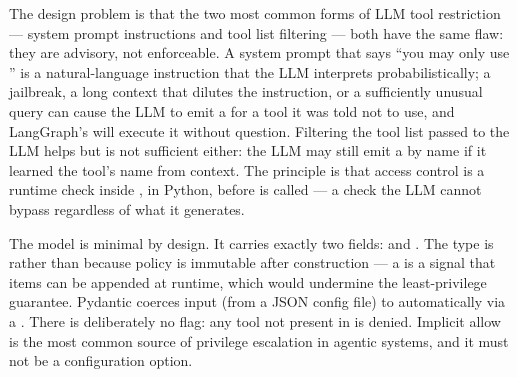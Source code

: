 The design problem is that the two most common forms of LLM tool
restriction --- system prompt instructions and tool list filtering --- both
have the same flaw: they are advisory, not enforceable. A system prompt
that says ``you may only use '' is a natural-language
instruction that the LLM interprets probabilistically; a jailbreak, a
long context that dilutes the instruction, or a sufficiently unusual query
can cause the LLM to emit a  for a tool it was told not
to use, and LangGraph's  will execute it without question.
Filtering the tool list passed to the LLM helps but is not sufficient
either: the LLM may still emit a  by name if it learned
the tool's name from context. The principle is that access control is a
runtime check inside , in Python, before
 is called --- a check the LLM cannot
bypass regardless of what it generates.

The  model is minimal by design. It carries exactly two
fields:  and . The type is  rather than 
because policy is immutable after construction --- a  is a
signal that items can be appended at runtime, which would undermine the
least-privilege guarantee. Pydantic coerces  input (from a
JSON config file) to  automatically via a
. There is deliberately no 
flag: any tool not present in  is denied.
Implicit allow is the most common source of privilege escalation in
agentic systems, and it must not be a configuration option.

